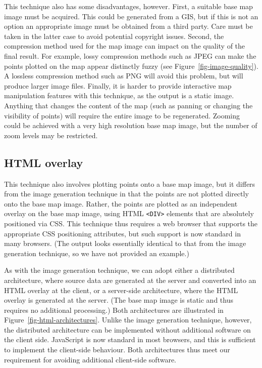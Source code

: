 \documentclass[acmtocl,acmnow]{acmtrans2m}
\begin{document}
This technique also has some disadvantages, however. First, a suitable
base map image must be acquired. This could be generated from a GIS, but
if this is not an option an appropriate image must be obtained from a
third party. Care must be taken in the latter case to avoid potential
copyright issues. Second, the compression method used for the map image
can impact on the quality of the final result. For example, lossy
compression methods such as JPEG can make the points plotted on the map
appear distinctly fuzzy (see Figure~\ref{fig-image-quality}). A
lossless compression method such as PNG will avoid this problem, but
will produce larger image files. Finally, it is harder to provide
interactive map manipulation features with this technique, as the output
is a static image. Anything that changes the content of the map (such as
panning or changing the visibility of points) will require the entire
image to be regenerated. Zooming could be achieved with a very high
resolution base map image, but the number of zoom levels may be
restricted.


\subsection{HTML overlay}
\label{sec-overlay}

This technique also involves plotting points onto a base map image, but
it differs from the image generation technique in that the points are
not plotted directly onto the base map image. Rather, the points are
plotted as an independent overlay on the base map image, using HTML
\verb|<DIV>| elements that are absolutely positioned via CSS. This
technique thus requires a web browser that supports the appropriate CSS
positioning attributes, but such support is now standard in many
browsers. (The output looks essentially identical to that from the image
generation technique, so we have not provided an example.)

As with the image generation technique, we can adopt either a
distributed architecture, where source data are generated at the server
and converted into an HTML overlay at the client, or a server-side
architecture, where the HTML overlay is generated at the server. (The
base map image is static and thus requires no additional processing.)
Both architectures are illustrated in
Figure~\ref{fig-html-architectures}. Unlike the image generation
technique, however, the distributed architecture can be implemented
without additional software on the client side. JavaScript is now
standard in most browsers, and this is sufficient to implement the
client-side behaviour. Both architectures thus meet our requirement for
avoiding additional client-side software.
\end{document}
